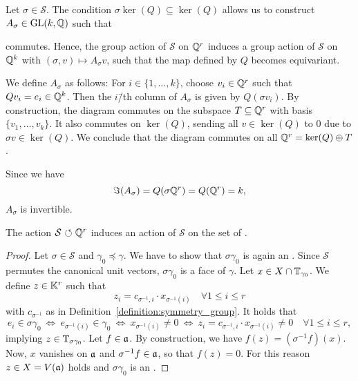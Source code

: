 \begin{remark}
	\label{remark:symmetry_group_on_image}
	Let $\sigma\in\mathcal{S}$. The condition $\sigma \ker(Q) \subseteq \ker(Q)$ allows us to construct $A_\sigma\in\text{GL}(k,\mathbb{Q})$ such that
	\begin{center}
	\end{center}
	commutes. Hence, the group action of $\mathcal{S}$ on $\mathbb{Q}^r$ induces a group action of $\mathcal{S}$ on $\mathbb{Q}^k$ with $(\sigma,v) \mapsto A_\sigma v$, such that the map defined by $Q$ becomes equivariant.
	
	We define $A_\sigma$ as follows: For $i\in\{1,\dots,k\}$, choose $v_i\in\mathbb{Q}^r$ such that $Q v_i = e_i\in\mathbb{Q}^k$. Then the $i$\=/th column of $A_\sigma$ is given by $Q(\sigma v_i)$. By construction, the diagram commutes on the subspace $T\subseteq\mathbb{Q}^r$ with basis $\{v_1,\dots,v_k\}$. It also commutes on $\ker(Q)$, sending all $v\in\ker(Q)$ to $0$ due to $\sigma v\in\ker(Q)$. We conclude that the diagram commutes on all $\mathbb{Q}^r = \ker(Q) \oplus T$.
	
	Since we have
	$$\Im(A_\sigma) = Q(\sigma\mathbb{Q}^r) = Q(\mathbb{Q}^r) = k,$$
	$A_\sigma$ is invertible.
\end{remark}

\begin{lemma}
	\label{lemma:symmetry_group_on_afaces}
	The action $\mathcal{S}{\ \circlearrowleft\ }\mathbb{Q}^r$ induces an action of $\mathcal{S}$ on the set of \afaces{}.
\end{lemma}
\begin{proof}
	Let $\sigma\in\mathcal{S}$ and $\gamma_0\preceq\gamma$. We have to show that $\sigma\gamma_0$ is again an \aface{}. Since $\mathcal{S}$ permutes the canonical unit vectors, $\sigma\gamma_0$ is a face of $\gamma$. Let $x\in X\cap \mathbb{T}_{\gamma_0}$. We define $z\in\mathbb{K}^r$ such that
	$$z_i = c_{\sigma^{-1},i} \cdot x_{\sigma^{-1}(i)}\quad\forall 1\leq i \leq r$$
	with $c_{\sigma^{-1}}$ as in Definition~\ref{definition:symmetry_group}. It holds that
	$$
	e_i\in\sigma\gamma_0
	\ \Leftrightarrow\ e_{\sigma^{-1}(i)}\in\gamma_0
	\ \Leftrightarrow\ x_{\sigma^{-1}(i)} \neq 0
	\ \Leftrightarrow\ z_i = c_{\sigma^{-1},i} \cdot x_{\sigma^{-1}(i)} \neq 0
	\quad\forall 1\leq i\leq r,
	$$
	implying $z\in\mathbb{T}_{\sigma\gamma_0}$. Let $f\in\mathfrak{a}$. By construction, we have $f(z) = (\sigma^{-1}f)(x)$. Now, $x$ vanishes on $\mathfrak{a}$ and $\sigma^{-1}f\in\mathfrak{a}$, so that $f(z) = 0$. For this reason $z\in X = V(\mathfrak{a})$ holds and $\sigma\gamma_0$ is an \aface{}.
\end{proof}

